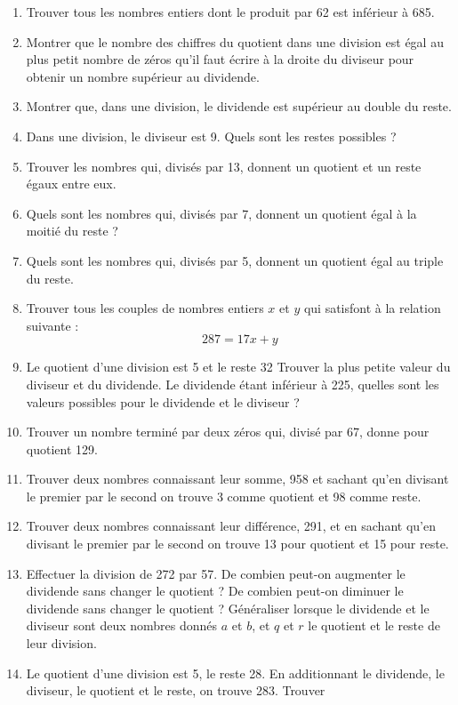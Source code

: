 \documentclass[12 pt]{report}
\theoremstyle{plain}
\newcounter{n}
\begin{document}
 \begin{enumerate}
 \item Trouver tous les nombres entiers dont le 
 produit par 62 est inférieur à 685. 
 \item Montrer que le nombre des chiffres du quotient
 dans une division est égal au plus petit nombre de zéros qu'il 
 faut écrire à la droite du diviseur pour 
 obtenir un nombre supérieur au dividende.
 \item Montrer que, dans une division, le dividende est
 supérieur au double du reste. 
 \item Dans une division, le diviseur est 9. 
 Quels sont les restes possibles ? 
 \item Trouver les nombres qui, divisés par 13, 
 donnent un quotient et un reste égaux entre eux. 
 \item Quels sont les nombres qui, divisés par 7, 
 donnent un quotient égal à la moitié du reste ? 
 \item Quels sont les nombres qui, divisés par 5, 
 donnent un quotient égal au triple du reste. 
 \item Trouver tous les couples de nombres entiers $x$
 et $y$ qui satisfont à la relation suivante :
 \[ 287 = 17x + y\]
 \item Le quotient d'une division est 5 et le reste 32
 Trouver la plus petite valeur du diviseur et du dividende. Le dividende étant inférieur à 225, quelles 
 sont les valeurs possibles pour le dividende et le
 diviseur ? 
 \item Trouver un nombre terminé par deux zéros qui,
 divisé par 67, donne pour quotient 129. 
 \item Trouver deux nombres connaissant leur somme, 
 958 et sachant qu'en divisant le premier par le second on trouve 3 comme quotient et 98 comme reste.
 \item Trouver deux nombres connaissant leur différence, 291, et en sachant qu'en divisant le 
 premier par le second on trouve 13 pour quotient et 15 pour reste. 
 \item Effectuer la division de 272 par 57. 
 De combien peut-on augmenter le dividende sans 
 changer le quotient ? De combien peut-on diminuer le 
 dividende sans changer le quotient ? Généraliser lorsque le dividende et le diviseur sont deux nombres
 donnés $a$ et $b$, et $q$ et $r$ le quotient et le 
 reste de leur division. 
 \item Le quotient d'une division est 5, le reste 28. 
 En additionnant le dividende, le diviseur, le
 quotient et le reste, on trouve 283. Trouver 

\end{enumerate}
\end{document}
